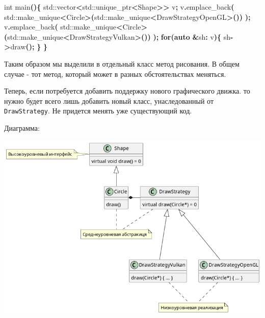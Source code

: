 \documentclass[14pt,a4paper]{article}
\newenvironment{Shaded}{\begin{paragraph}}{\end{paragraph}}
\newenvironment{Highlighting}{\begin{paragraph}}{\end{paragraph}}
\newcommand{\KeywordTok}[1]{\textcolor[rgb]{0.13,0.29,0.53}{\textbf{#1}}}
\newcommand{\DataTypeTok}[1]{\textcolor[rgb]{0.13,0.29,0.53}{#1}}
\newcommand{\ControlFlowTok}[1]{\textcolor[rgb]{0.13,0.29,0.53}{\textbf{#1}}}
\newcommand{\OperatorTok}[1]{\textcolor[rgb]{0.81,0.36,0.00}{\textbf{#1}}}
\newcommand{\BuiltInTok}[1]{#1}
\newcommand{\NormalTok}[1]{#1}
\begin{document}
\begin{Shaded}
\begin{Highlighting}[]
\DataTypeTok{int}\NormalTok{ main}\OperatorTok{()\{}
    \BuiltInTok{std::}\NormalTok{vector}\OperatorTok{\textless{}}\BuiltInTok{std::}\NormalTok{unique\_ptr}\OperatorTok{\textless{}}\NormalTok{Shape}\OperatorTok{\textgreater{}\textgreater{}}\NormalTok{ v}\OperatorTok{;}
\NormalTok{    v}\OperatorTok{.}\NormalTok{emplace\_back}\OperatorTok{(}
            \BuiltInTok{std::}\NormalTok{make\_unique}\OperatorTok{\textless{}}\NormalTok{Circle}\OperatorTok{\textgreater{}(}\BuiltInTok{std::}\NormalTok{make\_unique}\OperatorTok{\textless{}}\NormalTok{DrawStrategyOpenGL}\OperatorTok{\textgreater{}())}
    \OperatorTok{);}
\NormalTok{    v}\OperatorTok{.}\NormalTok{emplace\_back}\OperatorTok{(}
            \BuiltInTok{std::}\NormalTok{make\_unique}\OperatorTok{\textless{}}\NormalTok{Circle}\OperatorTok{\textgreater{}(}\BuiltInTok{std::}\NormalTok{make\_unique}\OperatorTok{\textless{}}\NormalTok{DrawStrategyVulkan}\OperatorTok{\textgreater{}())}
    \OperatorTok{);}
    \ControlFlowTok{for}\OperatorTok{(}\KeywordTok{auto} \OperatorTok{\&}\NormalTok{sh}\OperatorTok{:}\NormalTok{ v}\OperatorTok{)\{}
\NormalTok{        sh}\OperatorTok{{-}\textgreater{}}\NormalTok{draw}\OperatorTok{();}
    \OperatorTok{\}}
\OperatorTok{\}}
\end{Highlighting}
\end{Shaded}

Таким образом мы выделили в отдельный класс метод рисования. В общем
случае - тот метод, который может в разных обстоятельствах меняться.

Теперь, если потребуется добавить поддержку нового графического движка.
то нужно будет всего лишь добавить новый класс, унаследованный от
\texttt{DrawStrategy}. Не придется менять уже существующий код.

Диаграмма:

\includegraphics{Strategy.png}
\end{document}
